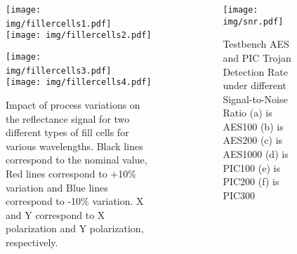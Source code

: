 \documentclass{beamer}
\begin{document}
\begin{columns}
                \begin{figure}[ht]
                    \begin{center}
                        \texttt{[image: img/fillercells1.pdf]}~
                        \texttt{[image: img/fillercells2.pdf]}\par
                        \texttt{[image: img/fillercells3.pdf]}~
                        \texttt{[image: img/fillercells4.pdf]}
                        \vspace{-0.1in}
                        \caption{Impact of process variations on the reflectance signal for two
                        different types of fill cells for various wavelengths. Black lines correspond to the nominal value, Red lines correspond to +10\% variation and Blue lines correspond to -10\% variation. X and Y correspond to X polarization and Y polarization, respectively.}
                        \label{fig:PV}
                        \vspace{-0.3in}
                    \end{center}
                \end{figure}

                \begin{figure}[ht]
                    \centering
                    \texttt{[image: img/snr.pdf]}
                    \vspace{-0.25in}
                    \label{fig:snr}
                    \caption{
                        {\color{black}Testbench AES and PIC Trojan Detection Rate under different
                    Signal-to-Noise Ratio
                    (a) is AES100
                    (b) is AES200
                    (c) is AES1000
                    (d) is PIC100
                    (e) is PIC200
                    (f) is PIC300}
                    }
                    \vspace{-0.15in}
                \end{figure}


\end{columns}
\end{document}
